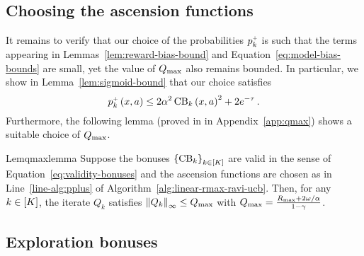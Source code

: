 \subsection{Choosing the ascension functions}

It remains to verify that our choice of the probabilities $p_k^{\mathsf{\scriptscriptstyle +}}$ is such that the terms appearing in Lemmas~\ref{lem:reward-bias-bound} and Equation~\eqref{eq:model-bias-bounds} are small, yet the value of $Q_{\max}$ also remains bounded. 
%
In particular, we show in Lemma~\ref{lem:sigmoid-bound} that our choice satisfies
%
\begin{equation} \label{eq:ascension-function-bound}
    p_k^{\mathsf{\scriptscriptstyle +}} \left( x, a \right) \leq 2 \alpha^2 \operatorname{CB}_k \left( x, a \right)^2 + 2 e^{- \tau}\,.
\end{equation}
%
Furthermore, the following lemma (proved in in Appendix~\ref{app:qmax}) shows a suitable choice of $Q_{\max}$.
%
\begin{restatable}{Lem}{qmaxlemma} \label{lem:qmax}
    Suppose the bonuses $\left\{ \operatorname{CB}_k \right\}_{k \in \left[ K \right]}$ are valid in the sense of Equation~\ref{eq:validity-bonuses} and the ascension functions are chosen as in Line~\ref{line-alg:pplus} of Algorithm~\ref{alg:linear-rmax-ravi-ucb}. Then, for any $k \in \left[ K \right]$, the iterate $Q_k$ satisfies $\left\|Q_k\right\|_\infty \leq Q_{\max}$ with $Q_{\max} = \frac{R_{\max} + 2 \omega / \alpha}{1 - \gamma}$.
\end{restatable}


\subsection{Exploration bonuses}

